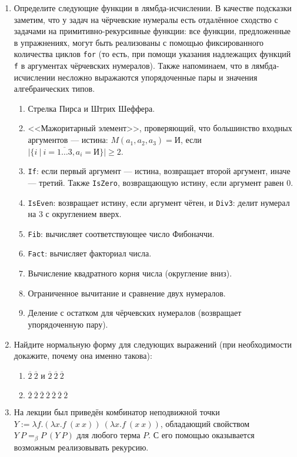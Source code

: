 \documentclass[10pt,a4paper,oneside]{article}
\begin{document}
\begin{enumerate}
\item Определите следующие функции в лямбда-исчислении. В качестве подсказки заметим, что у задач на чёрчевские
нумералы есть отдалённое сходство с задачами на примитивно-рекурсивные функции: все функции, предложенные 
в упражнениях, могут быть реализованы с помощью фиксированного количества циклов \verb!for! (то есть, при помощи 
указания надлежащих функций \verb!f! в аргументах чёрчевских нумералов). Также напоминаем, что в лямбда-исчислении
несложно выражаются упорядоченные пары и значения алгебраических типов.
\begin{enumerate}
\item Стрелка Пирса и Штрих Шеффера.
\item <<Мажоритарный элемент>>, проверяющий, что большинство входных аргументов --- истина: $M(a_1,a_2,a_3) = \text{И}$, 
если $|\{i\ |\ i=\overline{1\dots 3}, a_i = \text{И}\}| \ge 2$.
\item \verb!If!: если первый аргумент --- истина, возвращает второй аргумент, иначе --- третий. Также \verb!IsZero!, 
возвращающую истину, если аргумент равен 0.
\item \verb!IsEven!: возвращает истину, если аргумент чётен, и \verb!Div3!: делит нумерал на 3 с округлением вверх.
\item \verb!Fib!: вычисляет соответствующее число Фибоначчи.
\item \verb!Fact!: вычисляет факториал числа.
\item Вычисление квадратного корня числа (округление вниз).
\item Ограниченное вычитание и сравнение двух нумералов.
\item Деление с остатком для чёрчевских нумералов (возвращает упорядоченную пару).
\end{enumerate}

\item Найдите нормальную форму для следующих выражений (при необходимости докажите, почему она именно такова):
\begin{enumerate}
\item $\overline{2}\ \overline{2}$ и $\overline{2}\ \overline{2}\ \overline{2}$
\item $\overline{2}\ \overline{2}\ \overline{2}\ \overline{2}\ \overline{2}\ \overline{2}\ \overline{2}$
\end{enumerate}

\item На лекции был приведён комбинатор неподвижной точки $Y := \lambda f.(\lambda x.f\ (x\ x))\ (\lambda x.f\ (x\ x))$, обладающий свойством
$Y\ P =_\beta P\ (Y\ P)$ для любого терма $P$. С его помощью оказывается возможным реализовывать рекурсию.


\end{enumerate}
\end{document}

